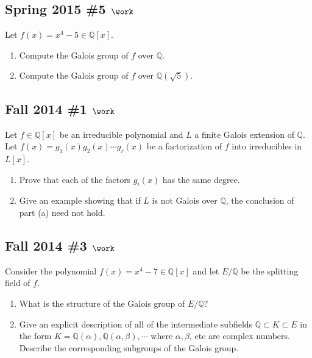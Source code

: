 \hypertarget{spring-2015-5-work}{%
\subsection{\texorpdfstring{Spring 2015 \#5
\(\work\)}{Spring 2015 \#5 \textbackslash work}}\label{spring-2015-5-work}}

Let \(f(x) = x^4 - 5 \in {\mathbb{Q}}[x]\).

\begin{enumerate}
\def\labelenumi{\alph{enumi}.}
\item
  Compute the Galois group of \(f\) over \({\mathbb{Q}}\).
\item
  Compute the Galois group of \(f\) over \({\mathbb{Q}}(\sqrt{5})\).
\end{enumerate}

\hypertarget{fall-2014-1-work}{%
\subsection{\texorpdfstring{Fall 2014 \#1
\(\work\)}{Fall 2014 \#1 \textbackslash work}}\label{fall-2014-1-work}}

Let \(f\in {\mathbb{Q}}[x]\) be an irreducible polynomial and \(L\) a
finite Galois extension of \({\mathbb{Q}}\). Let
\(f(x) = g_1(x)g_2(x)\cdots g_r(x)\) be a factorization of \(f\) into
irreducibles in \(L[x]\).

\begin{enumerate}
\def\labelenumi{\alph{enumi}.}
\item
  Prove that each of the factors \(g_i(x)\) has the same degree.
\item
  Give an example showing that if \(L\) is not Galois over
  \({\mathbb{Q}}\), the conclusion of part (a) need not hold.
\end{enumerate}

\hypertarget{fall-2014-3-work}{%
\subsection{\texorpdfstring{Fall 2014 \#3
\(\work\)}{Fall 2014 \#3 \textbackslash work}}\label{fall-2014-3-work}}

Consider the polynomial \(f(x) = x^4 - 7 \in {\mathbb{Q}}[x]\) and let
\(E/{\mathbb{Q}}\) be the splitting field of \(f\).

\begin{enumerate}
\def\labelenumi{\alph{enumi}.}
\item
  What is the structure of the Galois group of \(E/{\mathbb{Q}}\)?
\item
  Give an explicit description of all of the intermediate subfields
  \({\mathbb{Q}}\subset K \subset E\) in the form
  \(K = {\mathbb{Q}}(\alpha), {\mathbb{Q}}(\alpha, \beta), \cdots\)
  where \(\alpha, \beta\), etc are complex numbers. Describe the
  corresponding subgroups of the Galois group.
\end{enumerate}

